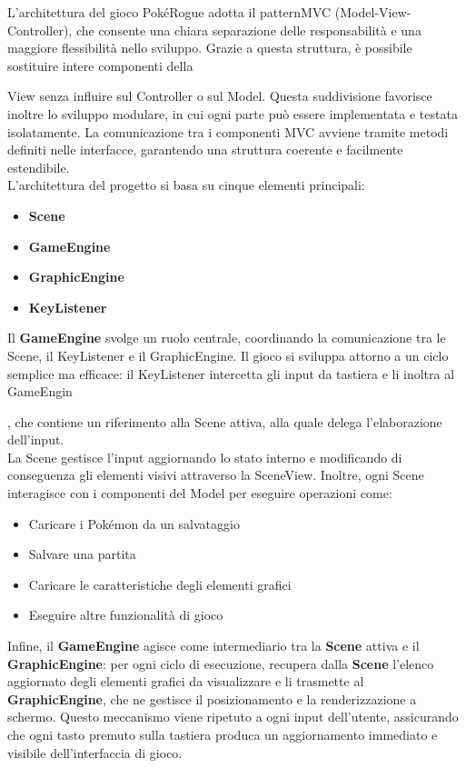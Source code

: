 \documentclass[a4paper,12pt]{report}
\begin{document}
{L'architettura del gioco PokéRogue adotta il patternMVC (Model-View-Controller), che consente una chiara separazione delle responsabilità e una maggiore flessibilità nello sviluppo. Grazie a questa struttura, è possibile sostituire intere componenti della {View senza influire sul Controller  o sul Model. Questa suddivisione favorisce inoltre lo sviluppo modulare, in cui ogni parte può essere implementata e testata isolatamente. La comunicazione tra i componenti MVC avviene tramite metodi definiti nelle interfacce, garantendo una struttura coerente e facilmente estendibile.\\
L’architettura del progetto si basa su cinque elementi principali:
\begin{itemize}
    \item \textbf{Scene}
    \item \textbf{GameEngine}
    \item \textbf{GraphicEngine}
    \item \textbf{KeyListener}
\end{itemize}
Il \textbf{GameEngine} svolge un ruolo centrale, coordinando la comunicazione tra le Scene, il KeyListener e il GraphicEngine. Il gioco si sviluppa attorno a un ciclo semplice ma efficace: il KeyListener intercetta gli input da tastiera e li inoltra al GameEngin}, che contiene un riferimento alla Scene attiva, alla quale delega l’elaborazione dell’input.\\
La Scene gestisce l’input aggiornando lo stato interno e modificando di conseguenza gli elementi visivi attraverso la SceneView. Inoltre, ogni Scene interagisce con i componenti del Model per eseguire operazioni come:
\begin{itemize}
    \item Caricare i Pokémon da un salvataggio
    \item Salvare una partita
    \item Caricare le caratteristiche degli elementi grafici
    \item Eseguire altre funzionalità di gioco
\end{itemize}

Infine, il \textbf{GameEngine} agisce come intermediario tra la \textbf{Scene} attiva e il \textbf{GraphicEngine}: per ogni ciclo di esecuzione, recupera dalla \textbf{Scene} l'elenco aggiornato degli elementi grafici da visualizzare e li trasmette al \textbf{GraphicEngine}, che ne gestisce il posizionamento e la renderizzazione a schermo. Questo meccanismo viene ripetuto a ogni input dell'utente, assicurando che ogni tasto premuto sulla tastiera produca un aggiornamento immediato e visibile dell'interfaccia di gioco.


}
\end{document}
